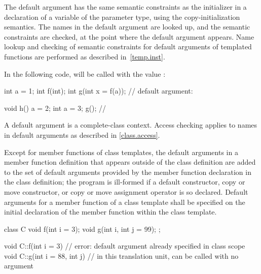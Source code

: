 \pnum
{}%
%
%
The default argument has the
same semantic constraints as the initializer in a
declaration of a variable of the parameter type, using the
copy-initialization semantics.
The names in the
default argument are looked up, and the semantic constraints are checked,
at the point where the default argument appears.
Name lookup and checking of semantic constraints for default
arguments of templated functions are performed as described in~\ref{temp.inst}.
\begin{example}
In the following code,
%
will be called with the value
:
\begin{codeblock}
int a = 1;
int f(int);
int g(int x = f(a));            // default argument: 

void h() {
  a = 2;
  {
  int a = 3;
  g();                          // 
  }
}
\end{codeblock}
\end{example}
\begin{note}
A default argument is a complete-class context.
Access checking applies to names in default arguments as
described in \ref{class.access}.
\end{note}

\pnum
Except for member functions of class templates, the
default arguments in a member function definition that appears
outside of the class definition
are added to the set of default arguments provided by the
member function declaration in the class definition;
the program is ill-formed if a default constructor,
copy or move constructor, or
copy or move assignment operator
is so declared.
Default arguments for a member function of a class template
shall be specified on the initial declaration of the member
function within the class template.
\begin{example}
\begin{codeblock}
class C {
  void f(int i = 3);
  void g(int i, int j = 99);
};

void C::f(int i = 3) {}         // error: default argument already specified in class scope
void C::g(int i = 88, int j) {} // in this translation unit,  can be called with no argument
\end{codeblock}
\end{example}

